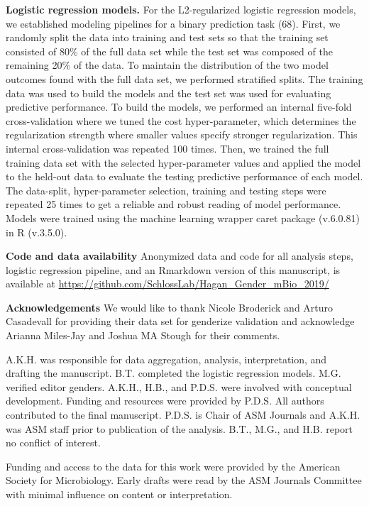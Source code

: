 \documentclass[11pt,]{article}
\begin{document}
\textbf{Logistic regression models.} For the L2-regularized logistic
regression models, we established modeling pipelines for a binary
prediction task (68). First, we randomly split the data into training
and test sets so that the training set consisted of 80\% of the full
data set while the test set was composed of the remaining 20\% of the
data. To maintain the distribution of the two model outcomes found with
the full data set, we performed stratified splits. The training data was
used to build the models and the test set was used for evaluating
predictive performance. To build the models, we performed an internal
five-fold cross-validation where we tuned the cost hyper-parameter,
which determines the regularization strength where smaller values
specify stronger regularization. This internal cross-validation was
repeated 100 times. Then, we trained the full training data set with the
selected hyper-parameter values and applied the model to the held-out
data to evaluate the testing predictive performance of each model. The
data-split, hyper-parameter selection, training and testing steps were
repeated 25 times to get a reliable and robust reading of model
performance. Models were trained using the machine learning wrapper
caret package (v.6.0.81) in R (v.3.5.0).

\textbf{Code and data availability} Anonymized data and code for all
analysis steps, logistic regression pipeline, and an Rmarkdown version
of this manuscript, is available at
\url{https://github.com/SchlossLab/Hagan_Gender_mBio_2019/}

\textbf{Acknowledgements} We would like to thank Nicole Broderick and
Arturo Casadevall for providing their data set for genderize validation
and acknowledge Arianna Miles-Jay and Joshua MA Stough for their
comments.

A.K.H. was responsible for data aggregation, analysis, interpretation,
and drafting the manuscript. B.T. completed the logistic regression
models. M.G. verified editor genders. A.K.H., H.B., and P.D.S. were
involved with conceptual development. Funding and resources were
provided by P.D.S. All authors contributed to the final manuscript.
P.D.S. is Chair of ASM Journals and A.K.H. was ASM staff prior to
publication of the analysis. B.T., M.G., and H.B. report no conflict of
interest.

Funding and access to the data for this work were provided by the
American Society for Microbiology. Early drafts were read by the ASM
Journals Committee with minimal influence on content or interpretation.
\end{document}
